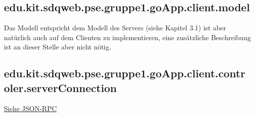	
	\subsection{edu.kit.sdqweb.pse.gruppe1.goApp.client.model}
	Das Modell entspricht dem Modell des Servers (siehe Kapitel 3.1) ist aber natürlich auch auf dem Clienten zu implementieren, eine zusätzliche Beschreibung ist an dieser Stelle aber nicht nötig.
	
	\subsection{edu.kit.sdqweb.pse.gruppe1.goApp.client.controler.serverConnection}
	\hyperlink{ServerConnection}{Siehe JSON-RPC}